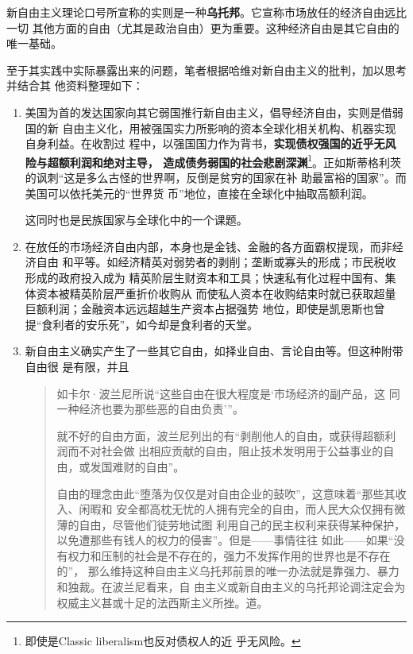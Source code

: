 新自由主义理论口号所宣称的实则是一种\textbf{乌托邦}。它宣称市场放任的经济自由远比一切
其他方面的自由（尤其是政治自由）更为重要。这种经济自由是其它自由的唯一基础。

至于其实践中实际暴露出来的问题，笔者根据哈维对新自由主义的批判，加以思考并结合其
他资料整理如下：
\begin{enumerate}
\item 美国为首的发达国家向其它弱国推行新自由主义，倡导经济自由，实则是借弱国的新
  自由主义化，用被强国实力所影响的资本全球化相关机构、机器实现自身利益。在收割过
  程中，以强国国力作为背书，\textbf{实现债权强国的近乎无风险与超额利润和绝对主导，
    造成债务弱国的社会悲剧深渊}\footnote{即使是Classic liberalism也反对债权人的近
    乎无风险。}。正如斯蒂格利茨的讽刺“这是多么古怪的世界啊，反倒是贫穷的国家在补
  助最富裕的国家”。而美国可以依托美元的“世界货
  币”地位，直接在全球化中抽取高额利润。

  这同时也是民族国家与全球化中的一个课题。

\item 在放任的市场经济自由内部，本身也是金钱、金融的各方面霸权提现，而非经济自由
  和平等。如经济精英对弱势者的剥削；垄断或寡头的形成；市民税收形成的政府投入成为
  精英阶层生财资本和工具；快速私有化过程中国有、集体资本被精英阶层严重折价收购从
  而使私人资本在收购结束时就已获取超量巨额利润；金融资本远远超越生产资本占据强势
  地位，即使是凯恩斯也曾提“食利者的安乐死”，如今却是食利者的天堂。
  
\item 新自由主义确实产生了一些其它自由，如择业自由、言论自由等。但这种附带自由很
  是有限，并且
  \begin{quotation}如卡尔·波兰尼所说“这些自由在很大程度是`市场经济的副产品，这
    同一种经济也要为那些恶的自由负责'”。

    就不好的自由方面，波兰尼列出的有“剥削他人的自由，或获得超额利润而不对社会做
    出相应贡献的自由，阻止技术发明用于公益事业的自由，或发国难财的自由”。

    自由的理念由此“堕落为仅仅是对自由企业的鼓吹”，这意味着“那些其收入、闲暇和
    安全都高枕无忧的人拥有完全的自由，而人民大众仅拥有微薄的自由，尽管他们徒劳地试图
    利用自己的民主权利来获得某种保护，以免遭那些有钱人的权力的侵害”。但是——事情往往
    如此——如果“没有权力和压制的社会是不存在的，强力不发挥作用的世界也是不存在的”，
    那么维持这种自由主义乌托邦前景的唯一办法就是靠强力、暴力和独裁。在波兰尼看来，自
    由主义或新自由主义的乌托邦论调注定会为权威主义甚或十足的法西斯主义所挫。道。
  \end{quotation}


\end{enumerate}
